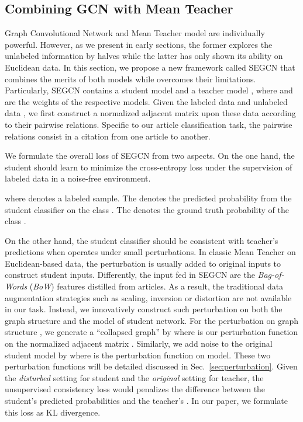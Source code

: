 \documentclass[letterpaper]{article} \usepackage{aaai19}  \usepackage{times}  \usepackage{helvet}  \usepackage{courier}  \usepackage{url}  \usepackage{graphicx}  \usepackage{algorithm}
\begin{document}
\subsection{Combining GCN with Mean Teacher}
Graph Convolutional Network and Mean Teacher model are individually powerful. However, as we present in early sections, the former explores the unlabeled information by halves while the latter has only shown its ability on Euclidean data. In this section, we propose a new framework called SEGCN that combines the merits of both models while overcomes their limitations. Particularly, SEGCN contains a student model  and a teacher model , where  and  are the weights of the respective models. Given the labeled data  and unlabeled data , we first construct a normalized adjacent matrix  upon these data according to their pairwise relations. Specific to our article classification task, the pairwise relations consist in a citation from one article to another. 

We formulate the overall loss of SEGCN from two aspects. On the one hand, the student should learn to minimize the cross-entropy loss under the supervision of labeled data in a noise-free environment. 
\newline

\newline
where  denotes a labeled sample. The  denotes the predicted probability from the student classifier on the class . The  denotes the ground truth probability of the class .

On the other hand, the student classifier should be consistent with teacher's predictions when operates under small perturbations. In classic Mean Teacher on Euclidean-based data, the perturbation is usually added to original inputs  to construct student inputs. Differently, the input fed in SEGCN are the \emph{Bag-of-Words} (\emph{BoW}) features distilled from articles. As a result, the traditional data augmentation strategies such as scaling, inversion or distortion are not available in our task. Instead, we innovatively construct such perturbation on both the graph structure and the model of student network. For the perturbation on graph structure , we generate a ``collapsed graph'' by  where  is our perturbation function on the normalized adjacent matrix . Similarly, we add noise to the original student model  by  where  is the perturbation function on model. These two perturbation functions will be detailed discussed in Sec.~\ref{sec:perturbation}. Given the \emph{disturbed} setting  for student and the \emph{original} setting  for teacher, the unsupervised consistency loss would penalizes the difference between the student's predicted probabilities  and the teacher's . In our paper, we formulate this loss as KL divergence.
\end{document}
